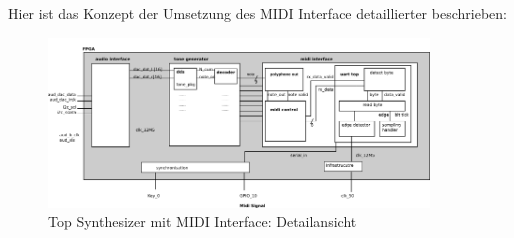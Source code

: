 Hier ist das Konzept der Umsetzung des MIDI Interface detaillierter beschrieben:

\begin{figure}[H]
	\includegraphics[width=0.9\textwidth]{images/midi_interface/top_synthesizer_detail_scaled.png}
	\caption{Top Synthesizer mit MIDI Interface: Detailansicht}
	\label{fig.top_synthesizer_detail}
\end{figure}
